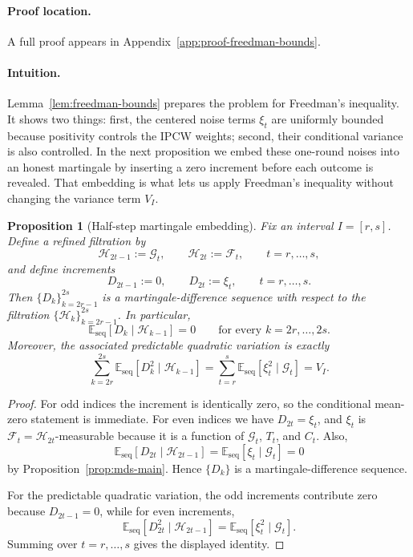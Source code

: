 \documentclass[11pt]{article}
\newtheorem{proposition}{Proposition}
\newcommand{\E}{\mathbb{E}}
\newcommand{\1}{\mathbf{1}}
\newcommand{\seq}{\mathrm{seq}}
\newcommand{\cG}{\mathcal{G}}
\newcommand{\cF}{\mathcal{F}}
\newcommand{\cH}{\mathcal{H}}
\begin{document}
\paragraph{Proof location.} A full proof appears in Appendix~\ref{app:proof-freedman-bounds}.


\paragraph{Intuition.} Lemma~\ref{lem:freedman-bounds} prepares the problem for Freedman's inequality. It shows two things: first, the centered noise terms $\xi_t$ are uniformly bounded because positivity controls the IPCW weights; second, their conditional variance is also controlled. In the next proposition we embed these one-round noises into an honest martingale by inserting a zero increment before each outcome is revealed. That embedding is what lets us apply Freedman's inequality without changing the variance term $V_I$.

\begin{proposition}[Half-step martingale embedding]
\label{prop:half-step-martingale}
Fix an interval $I=[r,s]$. Define a refined filtration by
\[
\cH_{2t-1}:=\cG_t,
\qquad
\cH_{2t}:=\cF_t,
\qquad t=r,\dots,s,
\]
and define increments
\[
D_{2t-1}:=0,
\qquad
D_{2t}:=\xi_t,
\qquad t=r,\dots,s.
\]
Then $\{D_k\}_{k=2r-1}^{2s}$ is a martingale-difference sequence with respect to the filtration $\{\cH_k\}_{k=2r-1}^{2s}$. In particular,
\[
\E_{\seq}[D_k\mid \cH_{k-1}]=0
\qquad\text{for every }k=2r,\dots,2s.
\]
Moreover, the associated predictable quadratic variation is exactly
\[
\sum_{k=2r}^{2s}\E_{\seq}[D_k^2\mid \cH_{k-1}]
=
\sum_{t=r}^s\E_{\seq}[\xi_t^2\mid \cG_t]
=V_I.
\]
\end{proposition}

\begin{proof}
For odd indices the increment is identically zero, so the conditional mean-zero statement is immediate. For even indices we have $D_{2t}=\xi_t$, and $\xi_t$ is $\cF_t=\cH_{2t}$-measurable because it is a function of $\cG_t$, $T_t$, and $C_t$. Also,
\[
\E_{\seq}[D_{2t}\mid \cH_{2t-1}]
=
\E_{\seq}[\xi_t\mid \cG_t]
=
0
\]
by Proposition~\ref{prop:mds-main}. Hence $\{D_k\}$ is a martingale-difference sequence.

For the predictable quadratic variation, the odd increments contribute zero because $D_{2t-1}=0$, while for even increments,
\[
\E_{\seq}[D_{2t}^2\mid \cH_{2t-1}]
=
\E_{\seq}[\xi_t^2\mid \cG_t].
\]
Summing over $t=r,\dots,s$ gives the displayed identity.
\end{proof}
\end{document}
